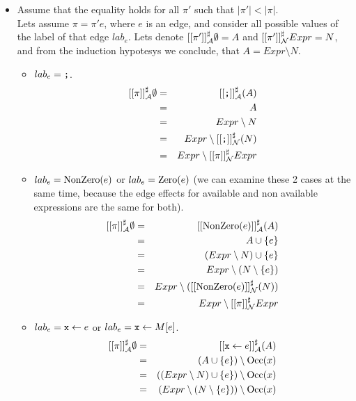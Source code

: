 \documentclass[a4paper]{article}
\begin{document}
\begin{itemize}
  \item Assume that the equality holds for all $ \pi' $ such that $ |\pi'|
  < |\pi| $. \\
  Lets assume $ \pi = \pi' e $, where $ e $ is an edge, and consider all
  possible values of the label of that edge $ lab_e $. Lets denote
  $ [[\pi']]^\sharp_{\mathcal{A}} \emptyset = A $ and $ [[\pi']]^\sharp_{\mathcal{N}}  Expr = N $, and from the
  induction hypotesys we conclude, that $ A = Expr \setminus N $.
  \begin{itemize}
    \item $ lab_e = \texttt{;} $.
    \begin{eqnarray*}
      [[\pi]]^\sharp_{\mathcal{A}} \emptyset &=& [[\texttt{;}]]^\sharp_{\mathcal{A}}(A) \\
        &=& A \\
        &=& Expr \setminus N \\
        &=& Expr \setminus [[\texttt{;}]]^\sharp_{\mathcal{N}}(N) \\
        &=& Expr \setminus [[\pi]]^\sharp_{\mathcal{N}} Expr \\
    \end{eqnarray*}
    \item $ lab_e = \mathrm{NonZero}(e) $ or $ lab_e = \mathrm{Zero}(e) $ (we can examine these
    2 cases at the same time, because the edge effects for available and non
    available expressions are the same for both). \\
    \begin{eqnarray*}
      [[\pi]]^\sharp_{\mathcal{A}} \emptyset &=& [[\mathrm{NonZero}(e)]]^\sharp_{\mathcal{A}}(A) \\
        &=& A \cup \{ e \} \\
        &=& (Expr \setminus N) \cup \{ e \} \\
        &=& Expr \setminus (N \setminus \{ e \}) \\
        &=& Expr \setminus ([[\mathrm{NonZero}(e)]]^\sharp_{\mathcal{N}}(N)) \\
        &=& Expr \setminus [[\pi]]^\sharp_{\mathcal{N}} Expr \\
    \end{eqnarray*}
    \item $ lab_e = \texttt{x} \leftarrow e $ or $ lab_e = \texttt{x} \leftarrow M[e] $.
    \begin{eqnarray*}
      \aee{\pi}_\A \emptyset &=& \aee{\cc{x} \leftarrow e}_\A(A) \\
        &=& (A \cup \{ e \}) \setminus \Occ(x) \\
        &=& ((Expr \setminus N) \cup \{ e \}) \setminus \Occ(x) \\
        &=& (Expr \setminus (N \setminus \{ e \})) \setminus \Occ(x) \\

\end{eqnarray*}
\end{itemize}
\end{itemize}
\end{document}
